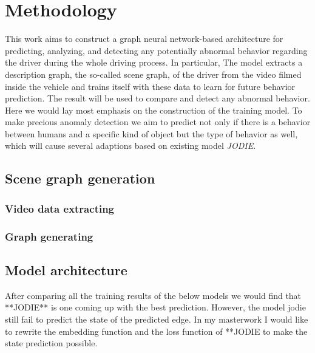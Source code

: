 \chapter{Methodology}\label{chapter:methodology}



This work aims to construct a graph neural network-based architecture for predicting, analyzing, and detecting any potentially abnormal behavior regarding the driver during the whole driving process. In particular, The model extracts a description graph, the so-called scene graph, of the driver from the video filmed inside the vehicle and trains itself with these data to learn for future behavior prediction. The result will be used to compare and detect any abnormal behavior. Here we would lay most emphasis on the construction of the training model. To make precious anomaly detection we aim to predict not only if there is a behavior between humans and a specific kind of object but the type of behavior as well, which will cause several adaptions based on existing model \textit{JODIE}.





\section{Scene graph generation}


    \subsection{Video data extracting}

    \subsection{Graph generating}

\section{Model architecture}




After comparing all the training results of the below models we would find that **JODIE** is one coming up with the best prediction. However, the model jodie still fail to predict the state of the predicted edge.
In my masterwork I would like to rewrite the embedding function and the loss function of **JODIE to make the state prediction possible.

